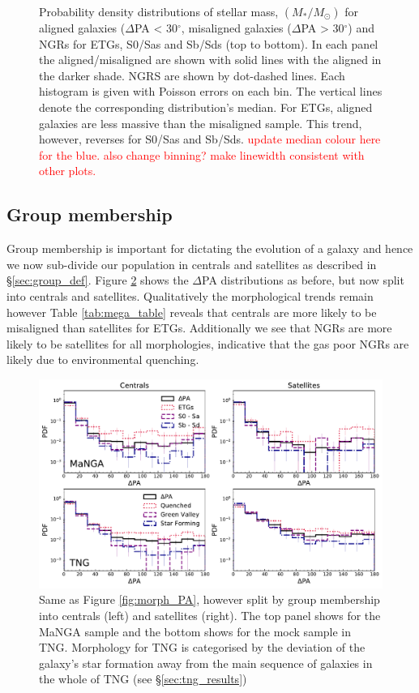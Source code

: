 \documentclass[fleqn,usenatbib]{mnras}
\newcommand{\red}[1]{{\textcolor{red}{#1}}}
\begin{document}
\begin{figure}
    \caption{Probability density distributions of stellar mass, $(M_{\ast}/M_{\odot})$ for aligned galaxies ($\Delta$PA < 30$^{\circ}$, misaligned galaxies ($\Delta$PA > 30$^{\circ}$) and NGRs for ETGs, S0/Sas and Sb/Sds (top to bottom). In each panel the aligned/misaligned are shown with solid lines with the aligned in the darker shade. NGRS are shown by dot-dashed lines. Each histogram is given with Poisson errors on each bin. The vertical lines denote the corresponding distribution's median. For ETGs, aligned galaxies are less massive than the misaligned sample. This trend, however, reverses for S0/Sas and Sb/Sds. \red{update median colour here for the blue. also change binning? make linewidth consistent with other plots.}}
    \label{fig:morph_stelM}
\end{figure}

\subsection{Group membership}
Group membership is important for dictating the evolution of a galaxy and hence we now sub-divide our population in centrals and satellites as described in \S\ref{sec:group_def}. Figure \ref{fig:group_morph_PA} shows the $\Delta$PA distributions as before, but now split into centrals and satellites. Qualitatively the morphological trends remain however Table \ref{tab:mega_table} reveals that centrals are more likely to be misaligned than satellites for ETGs. Additionally we see that NGRs are more likely to be satellites for all morphologies, indicative that the gas poor NGRs are likely due to environmental quenching. 

\begin{figure}
	\includegraphics[width=\linewidth]{total_pop/MPL8_TNG_morph_group_PA.pdf}
    \caption{Same as Figure \ref{fig:morph_PA}, however split by group membership into centrals (left) and satellites (right). The top panel shows for the MaNGA sample and the bottom shows for the mock sample in TNG. Morphology for TNG is categorised by the deviation of the galaxy's star formation away from the main sequence of galaxies in the whole of TNG (see \S\ref{sec:tng_results})}
    \label{fig:group_morph_PA}
\end{figure}
\end{document}
